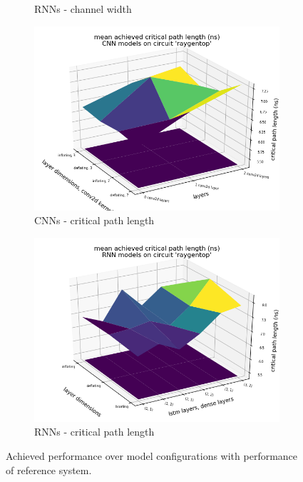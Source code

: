 \begin{figure}
\begin{subfigure}[b]{0.49\linewidth}
		\caption{\glspl{RNN} - channel width}
	\end{subfigure}
	\begin{subfigure}[b]{0.49\linewidth}
		\includegraphics[width=\linewidth]{plots/cnn-hyperopt-critical-path-with-reference.png}
		\caption{\glspl{CNN} - critical path length}
	\end{subfigure}
	\begin{subfigure}[b]{0.49\linewidth}
		\includegraphics[width=\linewidth]{plots/rnn-hyperopt-critical-path-with-reference.png}
		\caption{\glspl{RNN} - critical path length}
	\end{subfigure}
	\caption{Achieved performance over model configurations with performance of reference system.}
	\label{fig:eval-hyperopt-surface-reference}
\end{figure}

